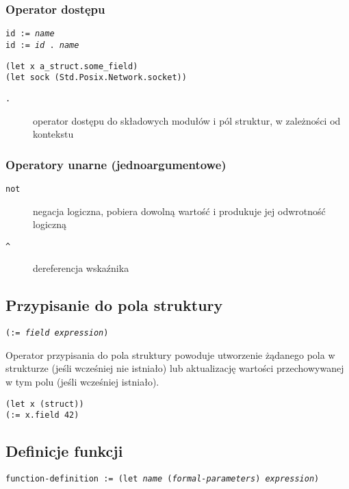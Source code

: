 \subsubsection{Operator dostępu}

\texttt{id := \emph{name}} \\
\texttt{id := \emph{id} . \emph{name}}

\begin{lstlisting}
(let x a_struct.some_field)
(let sock (Std.Posix.Network.socket))
\end{lstlisting}

\begin{description}
    \item[\texttt{.}] operator dostępu do składowych modułów i pól struktur, w zależności od kontekstu
\end{description}

\subsubsection{Operatory unarne (jednoargumentowe)}

\begin{description}
    \item[\texttt{not}] negacja logiczna, pobiera dowolną wartość i produkuje jej odwrotność logiczną
    \item[\texttt{\^}] dereferencja wskaźnika
\end{description}

\subsection{Przypisanie do pola struktury}

\texttt{(:= \emph{field} \emph{expression})}
\vspace{1em}

Operator przypisania do pola struktury powoduje utworzenie żądanego pola w strukturze (jeśli wcześniej nie
istniało) lub aktualizację wartości przechowywanej w tym polu (jeśli wcześniej istniało).

\begin{lstlisting}
(let x (struct))
(:= x.field 42)
\end{lstlisting}

\subsection{Definicje funkcji}

\texttt{function-definition := (let \emph{name} (\emph{formal-parameters}) \emph{expression})}
\vspace{1em}

